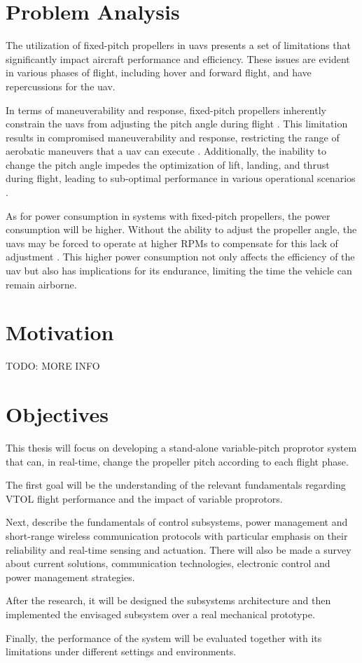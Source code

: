\section{Problem Analysis}
The utilization of fixed-pitch propellers in \glspl{uav} presents a set of limitations that significantly impact aircraft performance and efficiency.
These issues are evident in various phases of flight, including hover and forward flight, and have repercussions for the \gls{uav}.

In terms of maneuverability and response, fixed-pitch propellers inherently constrain the \glspl{uav} from adjusting the pitch angle during flight \cite{FPP1}.
This limitation results in compromised maneuverability and response, restricting the range of aerobatic maneuvers that a \gls{uav} can execute \cite{FPP1}.
Additionally, the inability to change the pitch angle impedes the optimization of lift, landing, and thrust during flight, leading to sub-optimal performance in various operational scenarios \cite{FPP1}.

As for power consumption in systems with fixed-pitch propellers, the power consumption will be higher.
Without the ability to adjust the propeller angle, the \glspl{uav} may be forced to operate at higher \glspl{RPM} to compensate for this lack of adjustment \cite{FPP1}.
This higher power consumption not only affects the efficiency of the \gls{uav} but also has implications for its endurance, limiting the time the vehicle can remain airborne.



\section{Motivation}
TODO: MORE INFO


\section{Objectives}
This thesis will focus on developing a stand-alone variable-pitch proprotor system that can, in real-time, change the propeller pitch according to each flight phase.

The first goal will be the understanding of the relevant fundamentals regarding \gls{VTOL} flight performance and the impact of variable proprotors.

Next, describe the fundamentals of control subsystems, power management and short-range wireless communication protocols with particular emphasis on their reliability and real-time sensing and actuation.
There will also be made a survey about current solutions, communication technologies, electronic control and power management strategies.

After the research, it will be designed the subsystems architecture and then implemented the envisaged subsystem over a real mechanical prototype.

Finally, the performance of the system will be evaluated together with its limitations under different settings and environments.
